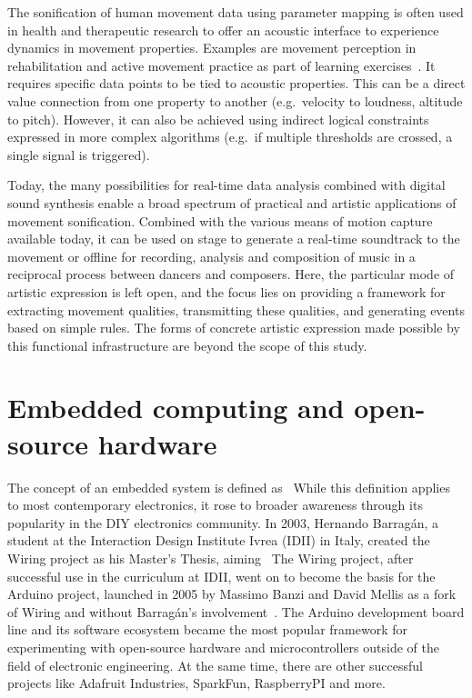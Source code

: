 The sonification of human movement data using parameter mapping is often used in health and therapeutic research to offer an acoustic interface to experience dynamics in movement properties.
Examples are movement perception in rehabilitation and active movement practice as part of learning exercises~\parencite[see][]{ifMotionSounds}.
It requires specific data points to be tied to acoustic properties.
This can be a direct value connection from one property to another (e.g.\ velocity to loudness, altitude to pitch).
However, it can also be achieved using indirect logical constraints expressed in more complex algorithms (e.g.\ if multiple thresholds are crossed, a single signal is triggered).

Today, the many possibilities for real-time data analysis combined with digital sound synthesis enable a broad spectrum of practical and artistic applications of movement sonification.
Combined with the various means of motion capture available today, it can be used on stage to generate a real-time soundtrack to the movement or offline for recording, analysis and composition of music in a reciprocal process between dancers and composers.
Here, the particular mode of artistic expression is left open, and the focus lies on providing a framework for extracting movement qualities, transmitting these qualities, and generating events based on simple rules.
The forms of concrete artistic expression made possible by this functional infrastructure are beyond the scope of this study.

\section{Embedded computing and open-source hardware}
\label{sec:embeddedcomputing}

The concept of an embedded system is defined as~
While this definition applies to most contemporary electronics, it rose to broader awareness through its popularity in the \ac{DIY} electronics community.
In 2003, Hernando Barragán, a student at the Interaction Design Institute Ivrea (IDII) in Italy, created the Wiring project as his Master's Thesis, aiming~
The Wiring project, after successful use in the curriculum at IDII, went on to become the basis for the Arduino project, launched in 2005 by Massimo Banzi and David Mellis as a fork of Wiring and without Barragán's involvement~\parencite{arduinoHistory}.
The Arduino development board line and its software ecosystem became the most popular framework for experimenting with open-source hardware and microcontrollers outside of the field of electronic engineering.
At the same time, there are other successful projects like Adafruit Industries, SparkFun, RaspberryPI and more.


